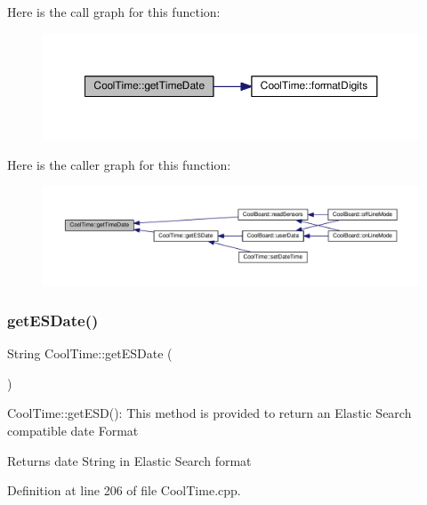 Here is the call graph for this function\+:
\nopagebreak
\begin{figure}[H]
\begin{center}
\leavevmode
\includegraphics[width=350pt]{d6/d49/class_cool_time_a7a7501c5ca77dd1248bea704c44f986c_cgraph}
\end{center}
\end{figure}
Here is the caller graph for this function\+:
\nopagebreak
\begin{figure}[H]
\begin{center}
\leavevmode
\includegraphics[width=350pt]{d6/d49/class_cool_time_a7a7501c5ca77dd1248bea704c44f986c_icgraph}
\end{center}
\end{figure}
\mbox{\label{class_cool_time_ac4f32ee513c1328d984306645e8785a4}} 
\subsubsection{\texorpdfstring{get\+E\+S\+Date()}{getESDate()}}
{\footnotesize\ttfamily String Cool\+Time\+::get\+E\+S\+Date (\begin{DoxyParamCaption}{ }\end{DoxyParamCaption})}

Cool\+Time\+::get\+E\+S\+D()\+: This method is provided to return an Elastic Search compatible date Format

\begin{DoxyReturn}{Returns}
date String in Elastic Search format 
\end{DoxyReturn}


Definition at line 206 of file Cool\+Time.\+cpp.



